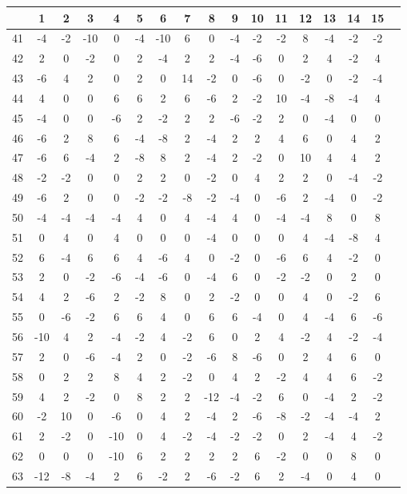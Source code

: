 \begin{tabular}{c|c|c|c|c|c|c|c|c|c|c|c|c|c|c|c|c}
    & 1 & 2 & 3 & 4 & 5 & 6 & 7 & 8 & 9 & 10 & 11 & 12 & 13 & 14 & 15 \\
    \hline
41 & -4 & -2 & -10 & 0 & -4 & -10 & 6 & 0 & -4 & -2 & -2 & 8 & -4 & -2 & -2 \\
\hline
42 & 2 & 0 & -2 & 0 & 2 & -4 & 2 & 2 & -4 & -6 & 0 & 2 & 4 & -2 & 4 \\
\hline
43 & -6 & 4 & 2 & 0 & 2 & 0 & 14 & -2 & 0 & -6 & 0 & -2 & 0 & -2 & -4 \\
\hline
44 & 4 & 0 & 0 & 6 & 6 & 2 & 6 & -6 & 2 & -2 & 10 & -4 & -8 & -4 & 4 \\
\hline
45 & -4 & 0 & 0 & -6 & 2 & -2 & 2 & 2 & -6 & -2 & 2 & 0 & -4 & 0 & 0 \\
\hline
46 & -6 & 2 & 8 & 6 & -4 & -8 & 2 & -4 & 2 & 2 & 4 & 6 & 0 & 4 & 2 \\
\hline
47 & -6 & 6 & -4 & 2 & -8 & 8 & 2 & -4 & 2 & -2 & 0 & 10 & 4 & 4 & 2 \\
\hline
    48 & -2 & -2 & 0 & 0 & 2 & 2 & 0 & -2 & 0 & 4 & 2 & 2 & 0 & -4 & -2 \\
    \hline
    49 & -6 & 2 & 0 & 0 & -2 & -2 & -8 & -2 & -4 & 0 & -6 & 2 & -4 & 0 & -2 \\
    \hline
    50 & -4 & -4 & -4 & -4 & 4 & 0 & 4 & -4 & 4 & 0 & -4 & -4 & 8 & 0 & 8 \\
    \hline
    51 & 0 & 4 & 0 & 4 & 0 & 0 & 0 & -4 & 0 & 0 & 0 & 4 & -4 & -8 & 4 \\
\hline
    52 & 6 & -4 & 6 & 6 & 4 & -6 & 4 & 0 & -2 & 0 & -6 & 6 & 4 & -2 & 0 \\
    \hline
    53 & 2 & 0 & -2 & -6 & -4 & -6 & 0 & -4 & 6 & 0 & -2 & -2 & 0 & 2 & 0 \\
    \hline
    54 & 4 & 2 & -6 & 2 & -2 & 8 & 0 & 2 & -2 & 0 & 0 & 4 & 0 & -2 & 6 \\
    \hline
    55 & 0 & -6 & -2 & 6 & 6 & 4 & 0 & 6 & 6 & -4 & 0 & 4 & -4 & 6 & -6 \\
    \hline
    56 & -10 & 4 & 2 & -4 & -2 & 4 & -2 & 6 & 0 & 2 & 4 & -2 & 4 & -2 & -4 \\
    \hline
    57 & 2 & 0 & -6 & -4 & 2 & 0 & -2 & -6 & 8 & -6 & 0 & 2 & 4 & 6 & 0 \\
    \hline
    58 & 0 & 2 & 2 & 8 & 4 & 2 & -2 & 0 & 4 & 2 & -2 & 4 & 4 & 6 & -2 \\
    \hline
    59 & 4 & 2 & -2 & 0 & 8 & 2 & 2 & -12 & -4 & -2 & 6 & 0 & -4 & 2 & -2 \\
    \hline
    60 & -2 & 10 & 0 & -6 & 0 & 4 & 2 & -4 & 2 & -6 & -8 & -2 & -4 & -4 & 2 \\
    \hline
    61 & 2 & -2 & 0 & -10 & 0 & 4 & -2 & -4 & -2 & -2 & 0 & 2 & -4 & 4 & -2 \\
    \hline
    62 & 0 & 0 & 0 & -10 & 6 & 2 & 2 & 2 & 2 & 6 & -2 & 0 & 0 & 8 & 0 \\
    \hline
    63 & -12 & -8 & -4 & 2 & 6 & -2 & 2 & -6 & -2 & 6 & 2 & -4 & 0 & 4 & 0
\end{tabular}

